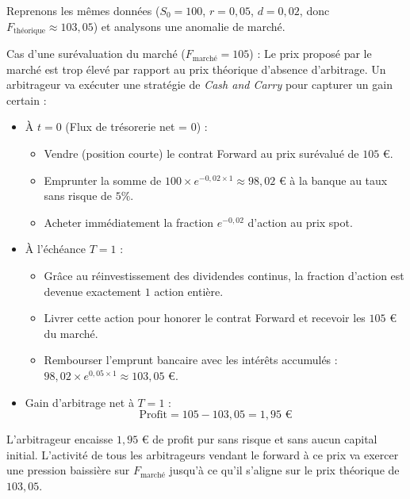 \begin{examplebox}
Reprenons les mêmes données ($S_0 = 100$, $r = 0,05$, $d = 0,02$, donc $F_{\text{théorique}} \approx 103,05$) et analysons une anomalie de marché.

Cas d'une surévaluation du marché ($F_{\text{marché}} = 105$) :
Le prix proposé par le marché est trop élevé par rapport au prix théorique d'absence d'arbitrage. Un arbitrageur va exécuter une stratégie de \textit{Cash and Carry} pour capturer un gain certain :
\begin{itemize}[label=$\rightarrow$]
    \item À $t = 0$ (Flux de trésorerie net = $0$) : 
    \begin{itemize}[label=$\cdot$]
        \item Vendre (position courte) le contrat Forward au prix surévalué de $105$ €.
        \item Emprunter la somme de $100 \times e^{-0,02 \times 1} \approx 98,02$ € à la banque au taux sans risque de $5\%$.
        \item Acheter immédiatement la fraction $e^{-0,02}$ d'action au prix spot.
    \end{itemize}
    \item À l'échéance $T = 1$ :
    \begin{itemize}[label=$\cdot$]
        \item Grâce au réinvestissement des dividendes continus, la fraction d'action est devenue exactement $1$ action entière.
        \item Livrer cette action pour honorer le contrat Forward et recevoir les $105$ € du marché.
        \item Rembourser l'emprunt bancaire avec les intérêts accumulés : $98,02 \times e^{0,05 \times 1} \approx 103,05$ €.
    \end{itemize}
    \item Gain d'arbitrage net à $T = 1$ : 
    \begin{equation}
        \label{eq:fsec2-ex_arbitrage_profit}
        \text{Profit} = 105 - 103,05 = 1,95 \text{ €}
    \end{equation}
\end{itemize}
L'arbitrageur encaisse $1,95$ € de profit pur sans risque et sans aucun capital initial. L'activité de tous les arbitrageurs vendant le forward à ce prix va exercer une pression baissière sur $F_{\text{marché}}$ jusqu'à ce qu'il s'aligne sur le prix théorique de $103,05$.
\end{examplebox}


